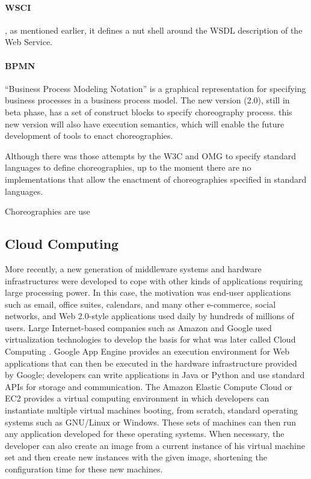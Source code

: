 \paragraph{WSCI}
, as mentioned earlier, it defines a nut shell around the WSDL description of the Web Service.

\paragraph{BPMN}
``Business Process Modeling Notation'' is a graphical representation for specifying business processes in a business process model. The new version (2.0), still in beta phase, has a set of construct blocks to specify choreography process. this new version will also have execution semantics, which will enable the future development of tools to enact choreographies.

Although there was those attempts by the W3C and OMG to specify standard languages to define choreographies, up to the moment there are no implementations that allow the enactment of choreographies specified in standard languages.

Choreographies are use


\subsection{Cloud Computing}
More recently, a new generation of middleware systems and hardware infrastructures were developed to cope with other kinds of applications requiring large processing power. In this case, the motivation was end-user applications such as email, office suites, calendars, and many other e-commerce, social networks, and Web 2.0-style applications used daily by hundreds of millions of users. Large Internet-based companies such as Amazon and Google used virtualization technologies to develop the basis for what was later called Cloud Computing \citep{ZCB10}. Google App Engine provides an execution environment for Web applications that can then be executed in the hardware infrastructure provided by Google; developers can write applications in Java or Python and use standard APIs for storage and communication.  The Amazon Elastic Compute Cloud or EC2 \citep{EC2} provides a virtual computing environment in which developers can instantiate multiple virtual machines booting, from scratch, standard operating systems such as GNU/Linux or Windows. These sets of machines can then run any application developed for these operating systems. When necessary, the developer can also create an image from a current instance of his virtual machine set and then create new instances with the given image, shortening the configuration time for these new machines.